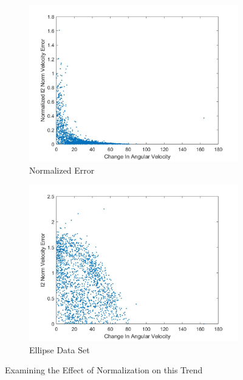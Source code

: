 \documentclass{article}
\begin{document}
\begin{figure}[h!]
    \centering
    \begin{subfigure}[b]{0.45\linewidth}
        \includegraphics[scale=0.125]{changeInOmegaEllipse.jpg}
        \caption{Normalized Error}
        \label{fig:originalPlot}
    \end{subfigure}
    \quad
    \begin{subfigure}[b]{0.45\linewidth}
       \includegraphics[scale=0.125]{newPlot.jpg}
        \caption{Ellipse Data Set}
        \label{fig:newerPlot}
    \end{subfigure}
    \caption{Examining the Effect of Normalization on this Trend}
\end{figure}
\end{document}
